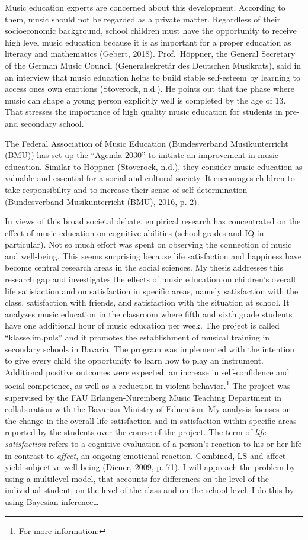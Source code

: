 \documentclass[a4, 12pt]{article}
\let\rmarkdownfootnote\footnote%
\def\footnote{\protect\rmarkdownfootnote}
\begin{document}
Music education experts are concerned about this development. According to them, music should not be regarded as a private matter. Regardless of their socioeconomic background, school children must have the opportunity to receive high level music education because it is as important for a proper education as literacy and mathematics (Gebert, 2018). Prof.~Höppner, the General Secretary of the German Music Council (Generalsekretär des Deutschen Musikrats), said in an interview that music education helps to build stable self-esteem by learning to access ones own emotions (Stoverock, n.d.). He points out that the phase where music can shape a young person explicitly well is completed by the age of 13. That stresses the importance of high quality music education for students in pre- and secondary school.

The Federal Association of Music Education (Bundesverband Musikunterricht (BMU)) has set up the ``Agenda 2030'' to initiate an improvement in music education. Similar to Höppner (Stoverock, n.d.), they consider music education as valuable and essential for a social and cultural society. It encourages children to take responsibility and to increase their sense of self-determination (Bundesverband Musikunterricht (BMU), 2016, p. 2).

In views of this broad societal debate, empirical research has concentrated on the effect of music education on cognitive abilities (school grades and IQ in particular). Not so much effort was spent on observing the connection of music and well-being. This seems surprising because life satisfaction and happiness have become central research areas in the social sciences. My thesis addresses this research gap and investigates the effects of music education on children's overall life satisfaction and on satisfaction in specific areas, namely satisfaction with the class, satisfaction with friends, and satisfaction with the situation at school. It analyzes music education in the classroom where fifth and sixth grade students have one additional hour of music education per week. The project is called ``klasse.im.puls'' and it promotes the establishment of musical training in secondary schools in Bavaria. The program was implemented with the intention to give every child the opportunity to learn how to play an instrument. Additional positive outcomes were expected: an increase in self-confidence and social competence, as well as a reduction in violent behavior.\footnote{For more information:} The project was supervised by the FAU Erlangen-Nuremberg Music Teaching Department in collaboration with the Bavarian Ministry of Education.
My analysis focuses on the change in the overall life satisfaction and in satisfaction within specific areas reported by the students over the course of the project. The term of \emph{life satisfaction} refers to a cognitive evaluation of a person's reaction to his or her life in contrast to \emph{affect}, an ongoing emotional reaction. Combined, LS and affect yield subjective well-being (Diener, 2009, p. 71). I will approach the problem by using a multilevel model, that accounts for differences on the level of the individual student, on the level of the class and on the school level. I do this by using Bayesian inference\ldots{}
\end{document}
